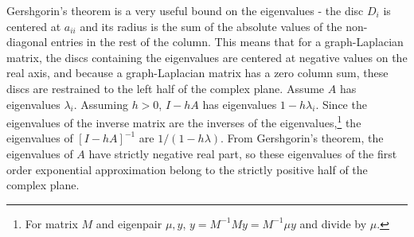 Gershgorin's theorem is a very useful bound on the eigenvalues - the disc $D_i$ is centered at $a_{ii}$ and its radius is the sum of the absolute values of the non-diagonal entries in the rest of the column.
This means that for a graph-Laplacian matrix, the discs containing the eigenvalues are centered at negative values on the real axis, and because a graph-Laplacian matrix has a zero column sum, these discs are restrained to the left half of the complex plane.
Assume $A$ has eigenvalues $\lambda_i$. Assuming $h>0$, $I - hA$ has eigenvalues $1-h \lambda_i$.
Since the eigenvalues of the inverse matrix are the inverses of the eigenvalues,\footnote{
    For matrix $M$ and eigenpair $\mu, y$, $y = M^{-1} My = M^{-1} \mu y$ and divide by $\mu$.
} the eigenvalues of $[I-hA]^{-1}$ are $1/(1-h \lambda)$.
From Gershgorin's theorem, the eigenvalues of $A$ have strictly negative real part,
so these eigenvalues of the first order exponential approximation belong to the strictly positive half of the complex plane. %


